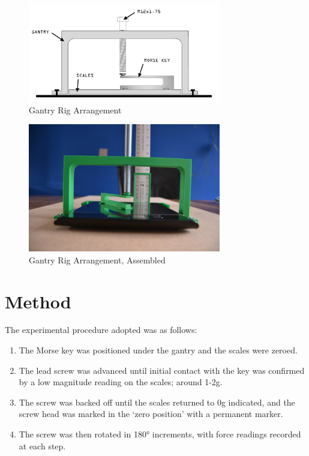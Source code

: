 \documentclass[10pt]{article}
\begin{document}
\begin{figure}[H]
	\centering
	\includegraphics[width=0.75\textwidth]{./assets/GantryArrangement.png}
	\caption{Gantry Rig Arrangement}
	\label{fig:gantry-rig}
\end{figure}

\begin{figure}[H]
	\centering
	\includegraphics[width=0.75\textwidth]{./assets/DSC_0001.JPG}
	\caption{Gantry Rig Arrangement, Assembled}
	\label{fig:gantry-rig-photo}
\end{figure}

\section{Method}

The experimental procedure adopted was as follows:
\begin{enumerate}
	\item The Morse key was positioned under the gantry and the scales were zeroed.
	\item The lead screw was advanced until initial contact with the key was confirmed by a low magnitude
	      reading on the scales; around 1-2g.
	\item The screw was backed off until the scales returned to 0g indicated, and the screw head was marked
	      in the `zero position' with a permanent marker.
	\item The screw was then rotated in 180° increments, with force readings recorded at each step.
\end{enumerate}
\end{document}
